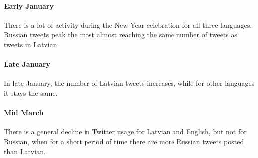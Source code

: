 \documentclass[11pt,a4paper]{article}
\begin{document}
\paragraph{Early January}

There is a lot of activity during the New Year celebration for all three languages. Russian tweets peak the most almost reaching the same number of tweets as tweets in Latvian.

\paragraph{Late January}

In late January, the number of Latvian tweets increases, while for other languages it stays the same.

\paragraph{Mid March}

There is a general decline in Twitter usage for Latvian and English, but not for Russian, when for a short period of time there are more Russian tweets posted than Latvian.



\end{document}
